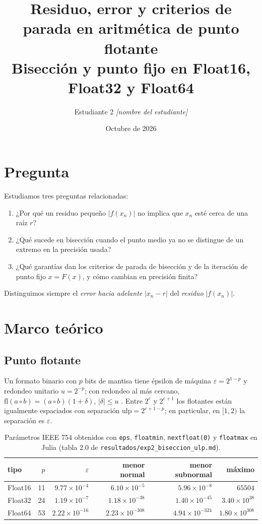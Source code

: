\documentclass[11pt]{article}
\title{Residuo, error y criterios de parada en aritmética de punto flotante\\
\large Bisección y punto fijo en Float16, Float32 y Float64}
\author{Estudiante 2 \quad \textit{[nombre del estudiante]}}
\date{Octubre de 2026}
\begin{document}
\maketitle

\section{Pregunta}
Estudiamos tres preguntas relacionadas:
\begin{enumerate}
\item ¿Por qué un residuo pequeño $|f(x_n)|$ no implica que $x_n$ esté cerca de una raíz $r$?
\item ¿Qué sucede en bisección cuando el punto medio ya no se distingue de un extremo en la precisión usada?
\item ¿Qué garantías dan los criterios de parada de bisección y de la iteración de punto fijo $x=F(x)$, y cómo cambian en precisión finita?
\end{enumerate}
Distinguimos siempre el \emph{error hacia adelante} $|x_n-r|$ del \emph{residuo} $|f(x_n)|$.

\section{Marco teórico}

\subsection{Punto flotante}
Un formato binario con $p$ bits de mantisa tiene épsilon de máquina $\varepsilon=2^{1-p}$ y redondeo unitario $u=2^{-p}$; con redondeo al más cercano, $\mathrm{fl}(a\circ b)=(a\circ b)(1+\delta)$, $|\delta|\le u$ \cite{cheney,higham}. Entre $2^e$ y $2^{e+1}$ los flotantes están igualmente espaciados con separación $\mathrm{ulp}=2^{e+1-p}$; en particular, en $[1,2)$ la separación es $\varepsilon$.

\begin{table}[H]\centering
\begin{tabular}{lrrrrr}\toprule
tipo & $p$ & $\varepsilon$ & menor normal & menor subnormal & máximo\\\midrule
Float16 & 11 & $9.77\times10^{-4}$ & $6.10\times10^{-5}$ & $5.96\times10^{-8}$ & $65504$\\
Float32 & 24 & $1.19\times10^{-7}$ & $1.18\times10^{-38}$ & $1.40\times10^{-45}$ & $3.40\times10^{38}$\\
Float64 & 53 & $2.22\times10^{-16}$ & $2.23\times10^{-308}$ & $4.94\times10^{-324}$ & $1.80\times10^{308}$\\\bottomrule
\end{tabular}
\caption{Parámetros IEEE 754 obtenidos con \texttt{eps}, \texttt{floatmin}, \texttt{nextfloat(0)} y \texttt{floatmax} en Julia (tabla 2.0 de \texttt{resultados/exp2\_biseccion\_ulp.md}).}
\end{table}
\end{document}

